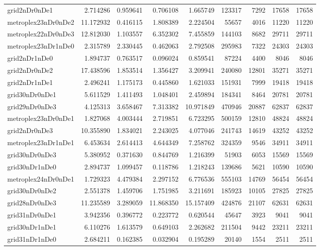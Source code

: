 \documentclass[../../../thesis.tex]{subfiles}
\begin{document}
\begin{longtable}{|l|r|r|r|r|r|r|r|r|}
grid2nDr0nDe1 & 2.714286 & 0.959641 & 0.706108 & 1.665749 & 123317 & 7292 & 17658 & 17658 \\
metroplex23nDr0nDe2 & 11.172932 & 0.416115 & 1.808389 & 2.224504 & 55657 & 4016 & 11220 & 11220 \\
metroplex22nDr0nDe3 & 12.812030 & 1.103557 & 6.352302 & 7.455859 & 144103 & 8682 & 29711 & 29711 \\
metroplex23nDr1nDe0 & 2.315789 & 2.330445 & 0.462063 & 2.792508 & 295983 & 7322 & 24303 & 24303 \\
grid2nDr1nDe0 & 1.894737 & 0.763517 & 0.096024 & 0.859541 & 87224 & 4400 & 8046 & 8046 \\
grid2nDr0nDe2 & 17.438596 & 1.853514 & 1.356427 & 3.209941 & 240080 & 12801 & 35271 & 35271 \\
grid2nDr1nDe1 & 2.496241 & 1.175173 & 0.445860 & 1.621033 & 151931 & 7999 & 19418 & 19418 \\
grid30nDr0nDe1 & 5.611529 & 1.411493 & 1.048401 & 2.459894 & 184341 & 8464 & 20781 & 20781 \\
grid29nDr0nDe3 & 4.125313 & 3.658467 & 7.313382 & 10.971849 & 470946 & 20887 & 62837 & 62837 \\
metroplex23nDr0nDe1 & 1.827068 & 4.003444 & 2.719851 & 6.723295 & 500159 & 12810 & 48824 & 48824 \\
grid2nDr0nDe3 & 10.355890 & 1.834021 & 2.243025 & 4.077046 & 241743 & 14619 & 43252 & 43252 \\
metroplex23nDr1nDe1 & 6.453634 & 2.614413 & 4.644349 & 7.258762 & 324359 & 9546 & 34911 & 34911 \\
grid30nDr0nDe3 & 5.380952 & 0.371630 & 0.844769 & 1.216399 & 51903 & 6053 & 15569 & 15569 \\
grid30nDr1nDe0 & 2.894737 & 1.099457 & 0.118786 & 1.218243 & 139686 & 5621 & 10590 & 10590 \\
metroplex24nDr0nDe1 & 1.729323 & 4.479384 & 2.297152 & 6.776536 & 555103 & 14769 & 56454 & 56454 \\
grid30nDr0nDe2 & 2.551378 & 1.459706 & 1.751985 & 3.211691 & 185923 & 10105 & 27825 & 27825 \\
grid28nDr0nDe3 & 11.235589 & 3.289059 & 11.868350 & 15.157409 & 424876 & 21107 & 62631 & 62631 \\
grid31nDr0nDe1 & 3.942356 & 0.396772 & 0.223772 & 0.620544 & 45647 & 3923 & 9041 & 9041 \\
grid30nDr1nDe1 & 6.110276 & 1.613579 & 0.649103 & 2.262682 & 211504 & 9442 & 23211 & 23211 \\
grid31nDr1nDe0 & 2.684211 & 0.162385 & 0.032904 & 0.195289 & 20140 & 1554 & 2511 & 2511 \\

\end{longtable}
\end{document}
